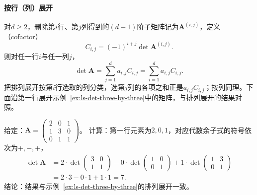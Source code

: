 \paragraph{按行（列）展开}
对$d\geq2$，删除第$i$行、第$j$列得到的$(d-1)$阶子矩阵记为$\bm A^{(i,j)}$，定义（cofactor）
\[
 C_{i,j}=(-1)^{i+j}\det\bm A^{(i,j)}.
\]
则对任一行$i$与任一列$j$，
\[
 \det\bm A=\sum_{j=1}^d a_{i,j}C_{i,j}=\sum_{i=1}^d a_{i,j}C_{i,j}.
\]
把排列展开按第$i$行选取的列分类，选第$j$列的各项之和正是$a_{i,j}C_{i,j}$；按列同理。下面沿第一行展开示例~\ref{ex:ls-det-three-by-three}中的矩阵，与排列展开的结果对照。
\begin{example}[沿第一行展开三阶行列式]
\label{ex:ls-det-cofactor-expansion}
给定：$\bm A=\left(\begin{smallmatrix}2&0&1\\1&3&0\\0&1&1\end{smallmatrix}\right)$。
计算：第一行元素为$2,0,1$，对应代数余子式的符号依次为$+,-,+$，
\[
 \begin{aligned}
 \det\bm A
 &=2\cdot\det\begin{pmatrix}3&0\\1&1\end{pmatrix}
 -0\cdot\det\begin{pmatrix}1&0\\0&1\end{pmatrix}
 +1\cdot\det\begin{pmatrix}1&3\\0&1\end{pmatrix}\\
 &=2\cdot3-0\cdot1+1\cdot1=7.
 \end{aligned}
\]
结论：结果与示例~\ref{ex:ls-det-three-by-three}的排列展开一致。
\end{example}

